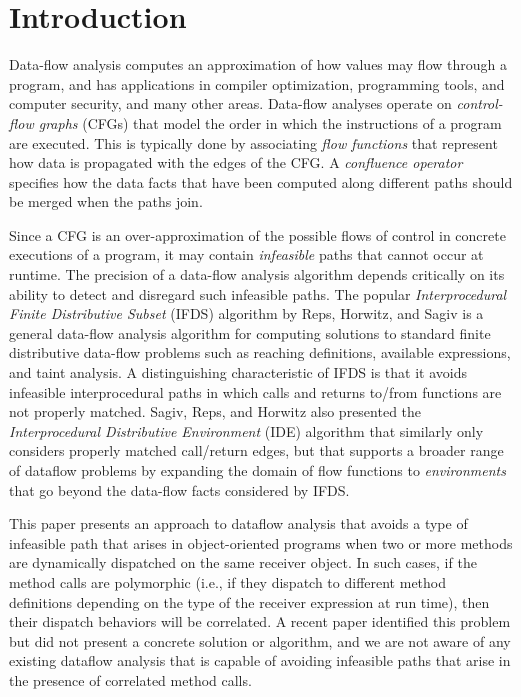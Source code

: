\section{Introduction}

Data-flow analysis computes an approximation of how values may flow  
through a program, and has applications in compiler optimization, 
programming tools, and computer security, and many other areas.
Data-flow analyses operate on \textit{control-flow graphs} (CFGs)
that model 
the order in which the instructions of a program are executed. This is
typically done by associating \textit{flow functions} that represent how 
data is propagated with the edges of the CFG.  A 
\textit{confluence operator} specifies how the data facts that have been 
computed along different paths should be merged when the paths join.

Since a CFG is an over-approximation of the possible flows 
of control in concrete executions of a program, it may contain \textit{infeasible} 
paths that cannot occur at runtime. The precision of a data-flow analysis algorithm
depends critically on its ability to detect and disregard such infeasible paths.
The popular \textit{Interprocedural Finite Distributive Subset} (IFDS) algorithm 
by  Reps, Horwitz, and Sagiv \cite{reps1995precise} is a general data-flow analysis
algorithm for computing solutions to standard finite distributive data-flow problems such 
as reaching definitions, available expressions, and taint analysis.
A distinguishing 
characteristic of IFDS is that it avoids infeasible interprocedural paths in which calls 
and returns to/from functions are not properly matched. Sagiv, Reps, and Horwitz
also presented the \textit{Interprocedural Distributive Environment} (IDE) algorithm
\cite{sagiv1996precise} that similarly only considers properly matched call/return
edges, but that supports a broader range of dataflow problems by expanding the 
domain of flow functions to \textit{environments} that go beyond the data-flow facts 
considered by IFDS.

This paper presents an approach to dataflow analysis that avoids a type
of infeasible path that arises in object-oriented programs when two or more
methods are dynamically dispatched on the same receiver object.
In such cases, if the
method calls are polymorphic (i.e., if they dispatch to different method definitions 
depending on the type of the receiver expression at run time), then their dispatch 
behaviors will be correlated. A recent paper \cite{DBLP:journals/scp/Tip15} identified
this problem but did not present a concrete solution or algorithm, and we are not aware 
of any existing dataflow analysis that is capable of avoiding infeasible paths that arise 
in the presence of correlated method calls.

